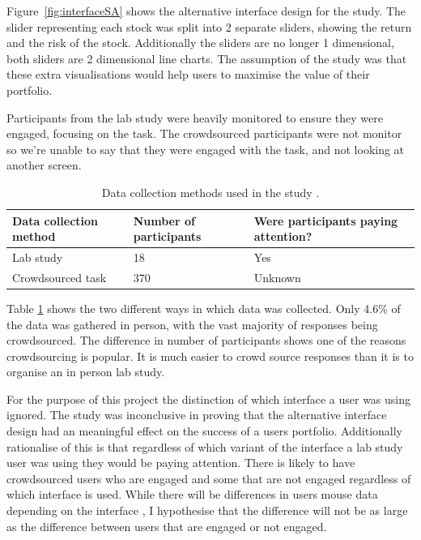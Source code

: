 \documentclass{article}
\begin{document}
Figure~\ref{fig:interfaceSA} shows the alternative interface design for the study.
The slider representing each stock was split into 2 separate sliders, showing the return and the risk of the stock.
Additionally the sliders are no longer 1 dimensional, both sliders are 2 dimensional line charts.
The assumption of the study was that these extra visualisations would help users to maximise the value of their portfolio.

Participants from the lab study were heavily monitored to ensure they were engaged, focusing on the task.
The crowdsourced participants were not monitor so we're unable to say that they were engaged with the task, and not looking at another screen. 

\begin{table}[ht]
    \caption{\label{table:studies} Data collection methods used in the study \cite{torsney2018risk}.}
    \small
    \begin{tabular}{lll}
        \hline
        Data collection method & Number of participants & Were participants paying attention? \\    \hline
        Lab study              & 18                     & Yes                                 \\
        Crowdsourced task      & 370                    & Unknown                             \\    \hline
    \end{tabular}
\end{table}

Table \ref{table:studies} shows the two different ways in which data was collected.
Only 4.6\% of the data was gathered in person, with the vast majority of responses being crowdsourced.
The difference in number of participants shows one of the reasons crowdsourcing is popular. 
It is much easier to crowd source responses than it is to organise an in person lab study.

For the purpose of this project the distinction of which interface a user was using ignored.
The study was inconclusive in proving that the alternative interface design had an meaningful effect on the success of a users portfolio. 
Additionally rationalise of this is that regardless of which variant of the interface a lab study user was using they would be paying attention.
There is likely to have crowdsourced users who are engaged and some that are not engaged regardless of which interface is used.
While there will be differences in users mouse data depending on the interface
    , I hypothesise that the difference will not be as large as the difference between users that are engaged or not engaged. 
\end{document}
